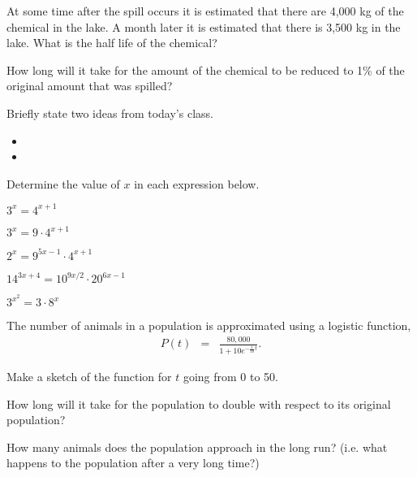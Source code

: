 \begin{problem}
\begin{subproblem}
  \item At some time after the spill occurs it is estimated that there
    are 4,000 kg of the chemical in the lake. A month later it is
    estimated that there is 3,500 kg in the lake. What is the half
    life of the chemical?  \vfill

  \item How long will it take for the amount of the chemical to be
    reduced to 1\% of the original amount that was spilled?
    \vfill
  \end{subproblem}

\end{problem}

\postClass

\begin{problem}
\item Briefly state two ideas from today's class.
  \begin{itemize}
  \item 
  \item 
  \end{itemize}
\item Determine the value of $x$ in each expression below.
  \begin{subproblem}
    \item $3^x = 4^{x+1}$
    \item $3^x = 9\cdot 4^{x+1}$
    \item $2^x = 9^{5x-1}\cdot 4^{x+1}$
    \item $14^{3x+4} = 10^{9x/2}\cdot 20^{6x-1}$
    \item $3^{x^2} = 3 \cdot 8^x$
  \end{subproblem}
\item The number of animals in a population is approximated using a
  logistic function,
  \begin{eqnarray*}
    P(t) & = & \frac{80,000}{1+10e^{-\frac{1}{10}t}}.
  \end{eqnarray*}
  \begin{subproblem}
  \item Make a sketch of the function for $t$ going from 0 to 50.
  \item How long will it take for the population to double with
    respect to its original population?
  \item How many animals does the population approach in the long run?
    (i.e. what happens to the population after a very long time?)
  \end{subproblem}
\end{problem}



